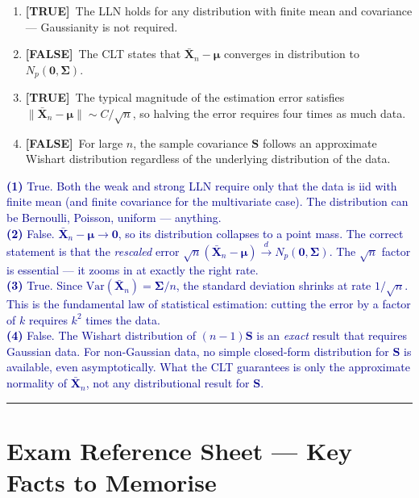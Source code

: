 \documentclass[12pt, a4paper]{article}
\newcommand{\T}{\textcolor{truegreen}{\textbf{[TRUE]}}}
\newcommand{\F}{\textcolor{falsered}{\textbf{[FALSE]}}}
\newcommand{\expl}[1]{\textcolor{darkblue}{\small #1}}
\begin{document}
\begin{enumerate}[label=(\arabic*)]
  \item \T\ The LLN holds for any distribution with finite mean and covariance --- Gaussianity is not required.
  \item \F\ The CLT states that $\bar{\mathbf{X}}_n - \boldsymbol{\mu}$ converges in distribution to $N_p(\mathbf{0}, \boldsymbol{\Sigma})$.
  \item \T\ The typical magnitude of the estimation error satisfies $\|\bar{\mathbf{X}}_n - \boldsymbol{\mu}\| \sim C/\sqrt{n}$, so halving the error requires four times as much data.
  \item \F\ For large $n$, the sample covariance $\mathbf{S}$ follows an approximate Wishart distribution regardless of the underlying distribution of the data.
\end{enumerate}

\expl{
\textbf{(1)} True. Both the weak and strong LLN require only that the data is iid with finite mean (and finite covariance for the multivariate case). The distribution can be Bernoulli, Poisson, uniform — anything.\\
\textbf{(2)} False. $\bar{\mathbf{X}}_n - \boldsymbol{\mu} \to \mathbf{0}$, so its distribution collapses to a point mass. The correct statement is that the \textit{rescaled} error $\sqrt{n}(\bar{\mathbf{X}}_n - \boldsymbol{\mu}) \xrightarrow{d} N_p(\mathbf{0}, \boldsymbol{\Sigma})$. The $\sqrt{n}$ factor is essential --- it zooms in at exactly the right rate.\\
\textbf{(3)} True. Since $\mathrm{Var}(\bar{\mathbf{X}}_n) = \boldsymbol{\Sigma}/n$, the standard deviation shrinks at rate $1/\sqrt{n}$. This is the fundamental law of statistical estimation: cutting the error by a factor of $k$ requires $k^2$ times the data.\\
\textbf{(4)} False. The Wishart distribution of $(n-1)\mathbf{S}$ is an \textit{exact} result that requires Gaussian data. For non-Gaussian data, no simple closed-form distribution for $\mathbf{S}$ is available, even asymptotically. What the CLT guarantees is only the approximate normality of $\bar{\mathbf{X}}_n$, not any distributional result for $\mathbf{S}$.
}

\vspace{2em}
\hrule
\vspace{1.5em}

\section*{Exam Reference Sheet --- Key Facts to Memorise}
\end{document}
